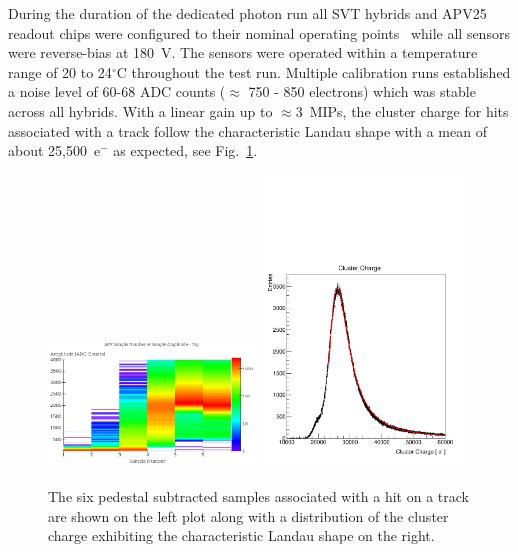 During the duration of the dedicated photon run all SVT hybrids and APV25 
readout chips were configured to their nominal operating 
points~\cite{Jones:1069892} while all sensors were reverse-bias at 180~V.  The 
sensors were operated within a temperature range of  20 to 24$^\circ$C 
throughout the test run. Multiple calibration runs established a noise level of 60-68 
ADC counts ($\approx$ 750 - 850 electrons)  which was stable across all hybrids. With a linear gain up to $\approx 3$~MIPs, the 
cluster charge for hits associated with a track follow the characteristic Landau shape with a 
mean of about 25,500~e$^{-}$ as expected, see Fig.~\ref{fig:cluster_pulse}.
\begin{figure}[h]
	\includegraphics[width=0.49\textwidth]{test2012/svtperformance/svt_calib/08062012_run1351_samples_vs_amplitude.png}
	\includegraphics[width=0.49\textwidth]{test2012/svtperformance/svt_calib/run1351_mip_small.pdf}
    \caption{The six pedestal subtracted samples associated with a hit on a track 
             are shown on the left plot along with a distribution of the cluster
             charge exhibiting the characteristic Landau shape on the right. 
            }
	\label{fig:cluster_pulse}
\end{figure}



